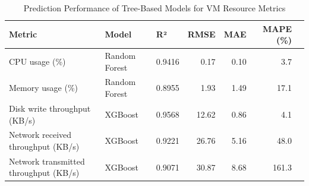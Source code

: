 
\begin{table}[htbp]
\centering
\caption{Prediction Performance of Tree-Based Models for VM Resource Metrics}
\label{tab:results}
\begin{tabular}{lllrrrr}
\toprule
\textbf{Metric} & \textbf{Model} & \textbf{R²} & \textbf{RMSE} & \textbf{MAE} & \textbf{MAPE (\%)} \\
\midrule
CPU usage (\%) & Random Forest & 0.9416 & 0.17 & 0.10 & 3.7 \\
Memory usage (\%) & Random Forest & 0.8955 & 1.93 & 1.49 & 17.1 \\
Disk write throughput (KB/s) & XGBoost & 0.9568 & 12.62 & 0.86 & 4.1 \\
Network received throughput (KB/s) & XGBoost & 0.9221 & 26.76 & 5.16 & 48.0 \\
Network transmitted throughput (KB/s) & XGBoost & 0.9071 & 30.87 & 8.68 & 161.3 \\
\bottomrule
\end{tabular}
\end{table}
